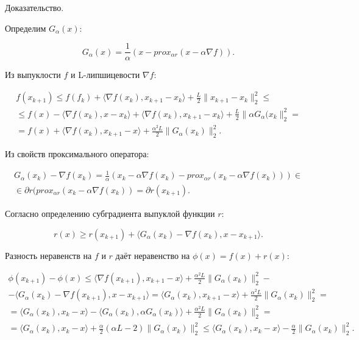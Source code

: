 Доказательство.

Определим $ G_\alpha(x)$:

\begin{equation}
    G_\alpha(x)=\frac1\alpha\left(x-prox_{\alpha r}(x-\alpha\nabla f)\right).
\end{equation}

Из выпуклости $f$ и L-липшицевости $\nabla f$:

\begin{equation}
    \begin{aligned}
        f(x_{k+1})\leq
        f(f_k)+\langle\nabla f(x_k),x_{k+1}-x_k\rangle+\frac L2\|x_{k+1}-x_k\|_2^2\leq                                      \\\leq
        f(x)-\langle\nabla f(x_k),x-x_k\rangle+\langle\nabla f(x_k),x_{k+1}-x_k\rangle+\frac L2\|\alpha G_\alpha(x_k\|_2^2= \\=
        f(x)+\langle\nabla f(x_k),x_{k+1}-x\rangle+\frac{\alpha^2L}2\|G_\alpha(x_k)\|_2^2.
    \end{aligned}
\end{equation}

Из свойств проксимального оператора:

\begin{equation}
    \begin{aligned}
        G_\alpha(x_k)-\nabla f(x_k)=
        \frac1\alpha\left(x_k-\alpha\nabla f(x_k)-prox_{\alpha r}(x_k-\alpha\nabla f(x_k))\right)\in \\\in\partial r(prox_{\alpha r}(x_k-\alpha\nabla f(x_k))=\partial r(x_{k+1}).
    \end{aligned}
\end{equation}

Согласно определению субградиента выпуклой функции $r$:

\begin{equation}
    r(x)\geq r(x_{k+1})+\langle G_\alpha(x_k)-\nabla f(x_k),x-x_{k+1}\rangle.
\end{equation}

Разность неравенств на $f$ и $r$ даёт неравенство на $\phi(x)=f(x)+r(x)$:

\begin{equation}
    \begin{aligned}
        \phi(x_{k+1})-\phi(x)\leq\langle\nabla f(x_{k+1}),x_{k+1}-x\rangle+\frac{\alpha^2L}2\|G_\alpha(x_k)\|_2^2-                   \\-\langle G_\alpha(x_k)-\nabla f(x_{k+1}),x-x_{k+1}\rangle=
        \langle G_\alpha(x_k),x_{k+1}-x\rangle+\frac{\alpha^2L}2\|G_\alpha(x_k)\|_2^2=                                               \\=
        \langle G_\alpha(x_k),x_k-x\rangle-\langle G_\alpha(x_k),\alpha G_\alpha(x_k)\rangle+\frac{\alpha^2L}2\|G_\alpha(x_k)\|_2^2= \\=
        \langle G_\alpha(x_k),x_k-x\rangle+\frac\alpha2(\alpha L-2)\|G_\alpha(x_k)\|_2^2\leq
        \langle G_\alpha(x_k),x_k-x\rangle-\frac\alpha2\|G_\alpha(x_k)\|_2^2.
    \end{aligned}
\end{equation}

